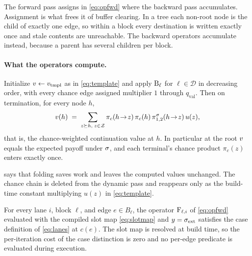 The forward pass assigns in \cref{eq:opfwd} where the backward pass accumulates.
Assignment is what frees it of buffer clearing. In a tree each non-root node is the
child of exactly one edge, so within a block every destination is written exactly
once and stale contents are unreachable. The backward operators accumulate instead, because a parent has several
children per block.

\paragraph{What the operators compute.}

\begin{proposition}
\label{prop:chance}
Initialize $v \gets v_{\mathrm{tmpl}}$ as in \cref{eq:template} and apply
$\mathrm{B}_\ell$ for $\ell \in \mathcal{D}$ in decreasing order, with every chance edge
assigned multiplier $1$ through $q_{\mathrm{val}}$. Then on termination, for every node
$h$,
\begin{equation}
    v(h) \;=\; \sum_{z \succeq h,\; z \in \mathcal{Z}}
        \pi_c(h \!\to\! z)\, \pi_c(h)\, \pi^{\sigma}_{1,2}(h \!\to\! z)\, u(z),
    \label{eq:chanceexact}
\end{equation}
that is, the chance-weighted continuation value at $h$. In particular at the root
$v$ equals the expected payoff under $\sigma$, and each terminal's chance product
$\pi_c(z)$ enters exactly once.
\end{proposition}

 says that folding saves work and leaves the computed values
unchanged. The chance chain is deleted from the dynamic pass and reappears only as
the build-time constant multiplying $u(z)$ in \cref{eq:template}.

\begin{proposition}
\label{prop:lanes}
For every lane $i$, block $\ell$, and edge $e \in B_\ell$, the operator $\mathrm{F}_{\ell,i}$
of \cref{eq:opfwd} evaluated with the compiled slot map \cref{eq:slotmap} and
$y = \sigma_{\mathrm{ext}}$ satisfies the case definition of \cref{eq:lanes} at
$c(e)$. The slot map is resolved at build time, so the per-iteration cost of the case
distinction is zero and no per-edge predicate is evaluated during execution.
\end{proposition}

